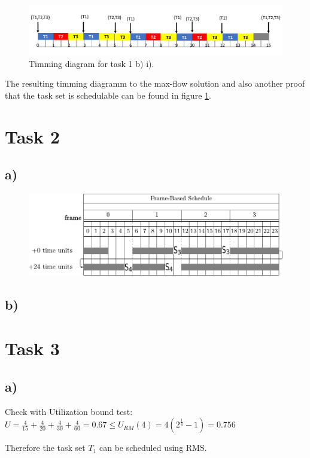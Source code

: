 \documentclass[10pt,a4paper]{article}
\begin{document}
\begin{figure}[h]
\includegraphics[width=\linewidth]{1b-timming-diagram.pdf}
\caption{Timming diagram for task 1 b) i).}
\label{fig:1biTimming}
\end{figure}

The resulting timming diagramm to the max-flow solution and also another proof that the task set is schedulable can be found in figure \ref{fig:1biTimming}.
\newpage
\section*{Task 2}
\subsection*{a)}

\begin{figure}[h]
\includegraphics[width=\linewidth]{2a.pdf}
\label{fig:2a}
\end{figure}
\subsection*{b)}

\section*{Task 3}
\subsection*{a)}
Check with Utilization bound test:
\newline
$U = \frac{4}{15} + \frac{4}{20} + \frac{4}{30} + \frac{4}{60} = 0.67 \leq U_{RM}(4) = 4(2^{\frac{1}{4}} - 1) = 0.756$

Therefore the task set $T_1$ can be scheduled using RMS.
\end{document}
